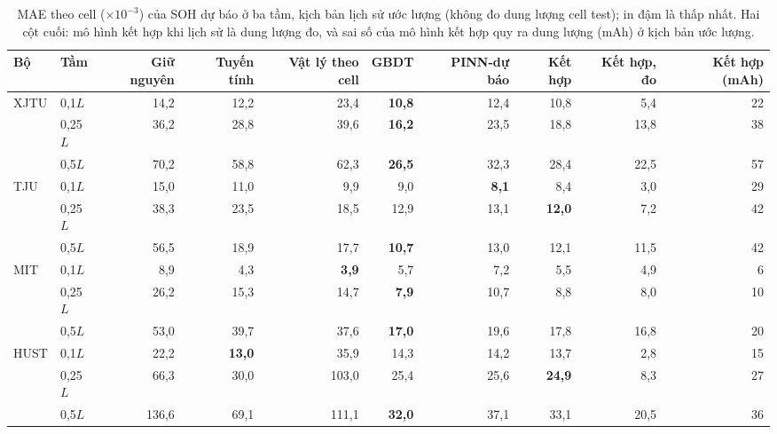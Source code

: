 \documentclass[12pt,a4paper,oneside]{report}
\theoremstyle{plain}
\theoremstyle{definition}
\begin{document}
\begin{table}[!htbp]\centering\small
\caption[MAE của SOH dự báo ở ba tầm]{MAE theo cell ($\times10^{-3}$) của SOH dự báo ở ba tầm, kịch bản lịch sử ước lượng (không đo dung lượng cell test); in đậm là thấp nhất. Hai cột cuối: mô hình kết hợp khi lịch sử là dung lượng đo, và sai số của mô hình kết hợp quy ra dung lượng (mAh) ở kịch bản ước lượng.}\label{tab:e22soh}
\begin{adjustbox}{max width=\textwidth}\begin{tabular}{llrrrrrrrr}\toprule
Bộ & Tầm & Giữ nguyên & Tuyến tính & Vật lý theo cell & GBDT & PINN-dự báo & Kết hợp & Kết hợp, đo & Kết hợp (mAh) \\\midrule
XJTU & 0{,}1$L$ & 14{,}2 & 12{,}2 & 23{,}4 & \textbf{10{,}8} & 12{,}4 & 10{,}8 & 5{,}4 & 22 \\
 & 0{,}25$L$ & 36{,}2 & 28{,}8 & 39{,}6 & \textbf{16{,}2} & 23{,}5 & 18{,}8 & 13{,}8 & 38 \\
 & 0{,}5$L$ & 70{,}2 & 58{,}8 & 62{,}3 & \textbf{26{,}5} & 32{,}3 & 28{,}4 & 22{,}5 & 57 \\
TJU & 0{,}1$L$ & 15{,}0 & 11{,}0 & 9{,}9 & 9{,}0 & \textbf{8{,}1} & 8{,}4 & 3{,}0 & 29 \\
 & 0{,}25$L$ & 38{,}3 & 23{,}5 & 18{,}5 & 12{,}9 & 13{,}1 & \textbf{12{,}0} & 7{,}2 & 42 \\
 & 0{,}5$L$ & 56{,}5 & 18{,}9 & 17{,}7 & \textbf{10{,}7} & 13{,}0 & 12{,}1 & 11{,}5 & 42 \\
MIT & 0{,}1$L$ & 8{,}9 & 4{,}3 & \textbf{3{,}9} & 5{,}7 & 7{,}2 & 5{,}5 & 4{,}9 & 6 \\
 & 0{,}25$L$ & 26{,}2 & 15{,}3 & 14{,}7 & \textbf{7{,}9} & 10{,}7 & 8{,}8 & 8{,}0 & 10 \\
 & 0{,}5$L$ & 53{,}0 & 39{,}7 & 37{,}6 & \textbf{17{,}0} & 19{,}6 & 17{,}8 & 16{,}8 & 20 \\
HUST & 0{,}1$L$ & 22{,}2 & \textbf{13{,}0} & 35{,}9 & 14{,}3 & 14{,}2 & 13{,}7 & 2{,}8 & 15 \\
 & 0{,}25$L$ & 66{,}3 & 30{,}0 & 103{,}0 & 25{,}4 & 25{,}6 & \textbf{24{,}9} & 8{,}3 & 27 \\
 & 0{,}5$L$ & 136{,}6 & 69{,}1 & 111{,}1 & \textbf{32{,}0} & 37{,}1 & 33{,}1 & 20{,}5 & 36 \\
\bottomrule\end{tabular}\end{adjustbox}\end{table}
\end{document}
